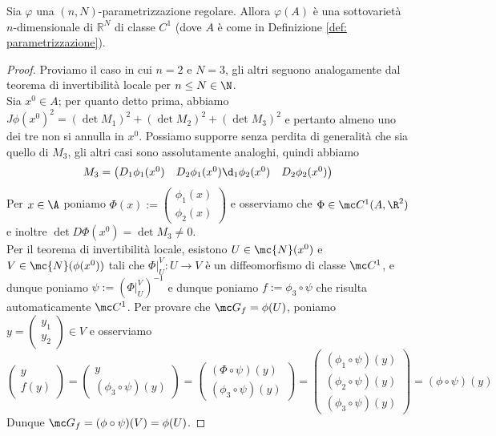 \begin{proposition}[$**$]\label{prop: 2.8}
    Sia $\varphi$ una $(n, N)$-parametrizzazione regolare. Allora $\varphi(A)$ è una sottovarietà $n$-dimensionale di $\mathbb{R}^{N}$ di classe $C^{1}$ (dove $A$ è come in Definizione \ref{def: parametrizzazione}).
\end{proposition}
\begin{proof}
    Proviamo il caso in cui $n=2$ e $N=3$, gli altri seguono analogamente dal teorema di invertibilità locale per $n\le N\in \N$.\\
    Sia $x^0 \in A$; per quanto detto prima, abbiamo $J\phi(x^0)^2 = (\det M_1)^2+(\det M_2)^2+(\det M_3)^2$ e pertanto almeno uno dei tre non si annulla in $x^0$. Possiamo supporre senza perdita di generalità che sia quello di $M_3$, gli altri casi sono assolutamente analoghi, quindi abbiamo
    \[M_3 = \begin{pmatrix} D_1\phi_1(x^0) & D_2\phi_1(x^0)\d_1\phi_2(x^0) & D_2\phi_2(x^0) \end{pmatrix}\]
    Per $x\in \A$ poniamo $\Phi(x) := \begin{pmatrix} \phi _1(x)\\ \phi_2(x)\end{pmatrix}$ e osserviamo che $\Phi\in\mc C ^1(A,\R^2)$ e inoltre $\det D\Phi(x^0)=\det M_3 \ne 0$.\\
    Per il teorema di invertibilità locale, esistono $U \in \mc{N}(x^0)$ e $V \in \mc{N}(\phi(x^0))$ tali che $\Phi|_U^V : U\to V$ è un diffeomorfismo di classe $\mc C^1$, e dunque poniamo $\psi := (\Phi|_U^V)^{-1}$ e dunque poniamo $f := \phi_3 \circ \psi $ che risulta automaticamente $\mc C^1$. Per provare che $\mc G_f = \phi(U)$, poniamo $y = \begin{pmatrix} y_1\\ y_2\end{pmatrix} \in V$ e osserviamo
    \[ \begin{pmatrix} y \\ f(y)\end{pmatrix} = \begin{pmatrix} y \\ (\phi_3 \circ \psi)(y)\end{pmatrix} = \begin{pmatrix} (\Phi\circ \psi)(y) \\ (\phi_3 \circ \psi)(y)\end{pmatrix} = \begin{pmatrix} (\phi_1\circ \psi)(y) \\ (\phi_2\circ \psi)(y) \\ (\phi_3 \circ \psi)(y)\end{pmatrix} = (\phi \circ \psi)(y)\]
    Dunque $\mc G_f = (\phi \circ \psi)(V) = \phi(U)$.
\end{proof}


